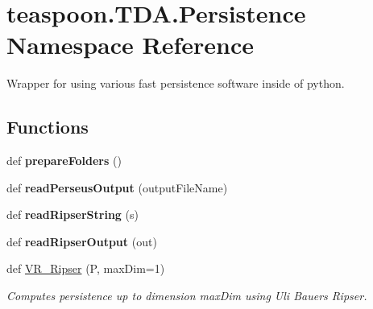 \hypertarget{namespaceteaspoon_1_1_t_d_a_1_1_persistence}{}\section{teaspoon.\+T\+D\+A.\+Persistence Namespace Reference}
\label{namespaceteaspoon_1_1_t_d_a_1_1_persistence}


Wrapper for using various fast persistence software inside of python.  


\subsection*{Functions}
\begin{DoxyCompactItemize}
\item 
\mbox{\label{namespaceteaspoon_1_1_t_d_a_1_1_persistence_aa767596a9f61323ef4e489e42890cd45}} 
def {\bfseries prepare\+Folders} ()
\item 
\mbox{\label{namespaceteaspoon_1_1_t_d_a_1_1_persistence_a3d273210437e69be2df595ed1751c661}} 
def {\bfseries read\+Perseus\+Output} (output\+File\+Name)
\item 
\mbox{\label{namespaceteaspoon_1_1_t_d_a_1_1_persistence_a862eea03c953145bb9290c1681f1f850}} 
def {\bfseries read\+Ripser\+String} (s)
\item 
\mbox{\label{namespaceteaspoon_1_1_t_d_a_1_1_persistence_a4ea0e5c0180eff1391c4ac0cf126694c}} 
def {\bfseries read\+Ripser\+Output} (out)
\item 
def \hyperlink{namespaceteaspoon_1_1_t_d_a_1_1_persistence_ae38f90d312da5c7fb8587a2f44e67b8a}{V\+R\+\_\+\+Ripser} (P, max\+Dim=1)
\begin{DoxyCompactList}\small\item\em Computes persistence up to dimension max\+Dim using Uli Bauer\textquotesingle{}s Ripser. \end{DoxyCompactList}\item 
\mbox{\label{namespaceteaspoon_1_1_t_d_a_1_1_persistence_a074e092c57bca5b1652c7b2a2c41f603}} 

\end{DoxyCompactItemize}
